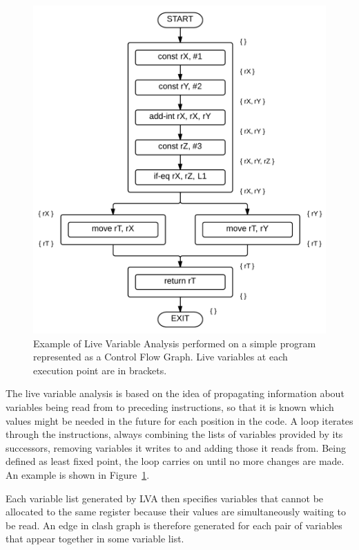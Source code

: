 \documentclass[12pt,twoside,notitlepage]{report}
\begin{document}
\begin{figure}[t]
	\centerline{
		\includegraphics[height=0.5\textheight]{figs/fig_implementation_lva.png}
	}
	\caption{Example of Live Variable Analysis performed on a simple program represented as a Control Flow Graph. Live variables at each execution point are in brackets.}
	\label{fig:Implementation_LVA}
\end{figure}

The live variable analysis is based on the idea of propagating information about variables being read from to preceding instructions, so that it is known which values might be needed in the future for each position in the code. A loop iterates through the instructions, always combining the lists of variables provided by its successors, removing variables it writes to and adding those it reads from. Being defined as least fixed point, the loop carries on until no more changes are made. An example is shown in Figure~\ref{fig:Implementation_LVA}.

Each variable list generated by LVA then specifies variables that cannot be allocated to the same register because their values are simultaneously waiting to be read. An edge in clash graph is therefore generated for each pair of variables that appear together in some variable list.
\end{document}
